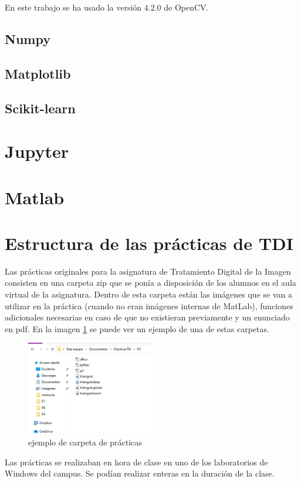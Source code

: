 \documentclass[a4paper,12pt]{report}
\begin{document}
En este trabajo se ha usado la versión 4.2.0 de OpenCV.\\

\subsection{Numpy}
\subsection{Matplotlib}
\subsection{Scikit-learn}	
\section{Jupyter}
\section{Matlab}
\section{Estructura de las prácticas de TDI}


Las prácticas originales para la asignatura de Tratamiento Digital de la Imagen consisten en una carpeta zip que se ponía a disposición de los alumnos en el aula virtual de la asignatura. Dentro de esta carpeta están las imágenes que se van a utilizar en la práctica (cuando no eran imágenes internas de MatLab), funciones adicionales necesarias en caso de que no existieran previamente y un enunciado en pdf. En la imagen \ref{carpetapracticas} se puede ver un ejemplo de una de estas carpetas.
\begin{figure}[h]
\centering
\includegraphics[width=0.5\textwidth]{carpetapracticas}
\caption{ejemplo de carpeta de prácticas}
\label{carpetapracticas}
\end{figure}

Las prácticas se realizaban en hora de clase en uno de los laboratorios de Windows del campus. Se podían realizar enteras en la duración de la clase. \\
\end{document}
